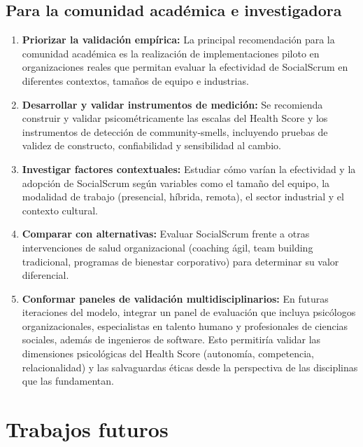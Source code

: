 \subsection{Para la comunidad académica e investigadora}

\begin{enumerate}
    \item \textbf{Priorizar la validación empírica:} La principal recomendación para la comunidad académica es la realización de implementaciones piloto en organizaciones reales que permitan evaluar la efectividad de SocialScrum en diferentes contextos, tamaños de equipo e industrias.

    \item \textbf{Desarrollar y validar instrumentos de medición:} Se recomienda construir y validar psicométricamente las escalas del Health Score y los instrumentos de detección de \gls{community-smells}, incluyendo pruebas de validez de constructo, confiabilidad y sensibilidad al cambio.

    \item \textbf{Investigar factores contextuales:} Estudiar cómo varían la efectividad y la adopción de SocialScrum según variables como el tamaño del equipo, la modalidad de trabajo (presencial, híbrida, remota), el sector industrial y el contexto cultural.

    \item \textbf{Comparar con alternativas:} Evaluar SocialScrum frente a otras intervenciones de salud organizacional (coaching ágil, team building tradicional, programas de bienestar corporativo) para determinar su valor diferencial.

    \item \textbf{Conformar paneles de validación multidisciplinarios:} En futuras iteraciones del modelo, integrar un panel de evaluación que incluya psicólogos organizacionales, especialistas en talento humano y profesionales de ciencias sociales, además de ingenieros de software. Esto permitiría validar las dimensiones psicológicas del Health Score (autonomía, competencia, relacionalidad) y las salvaguardas éticas desde la perspectiva de las disciplinas que las fundamentan.
\end{enumerate}

\section{Trabajos futuros}
\label{sec:trabajos-futuros}

